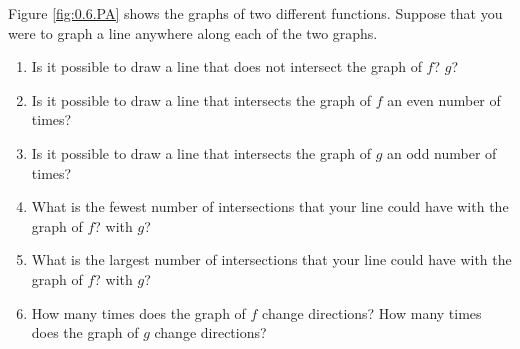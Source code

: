 \begin{pa} \label{PA:0.6}
    
Figure \ref{fig:0.6.PA} shows the graphs of two different functions.  Suppose that you were to graph a line anywhere along each of the two graphs.

\begin{enumerate}
	\item Is it possible to draw a line that does not intersect the graph of $f$? $g$?
	\item Is it possible to draw a line that intersects the graph of $f$ an even number of times?
	\item Is it possible to draw a line that intersects the graph of $g$ an odd number of times?
	\item What is the fewest number of intersections that your line could have with the graph of $f$? with $g$?
	\item What is the largest number of intersections that your line could have with the graph of $f$? with $g$?
	\item How many times does the graph of $f$ change directions? How many times does the graph of $g$ change directions?
\end{enumerate}

\begin{figure}[ht!]


\end{figure}
\end{pa}
